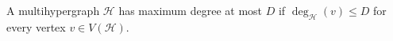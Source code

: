 \begin{definition}
A multihypergraph $\mathcal H$ has maximum degree at most $D$ if
$\deg_{\mathcal H}(v)\le D$ for every vertex $v\in V(\mathcal H)$.
\end{definition}
